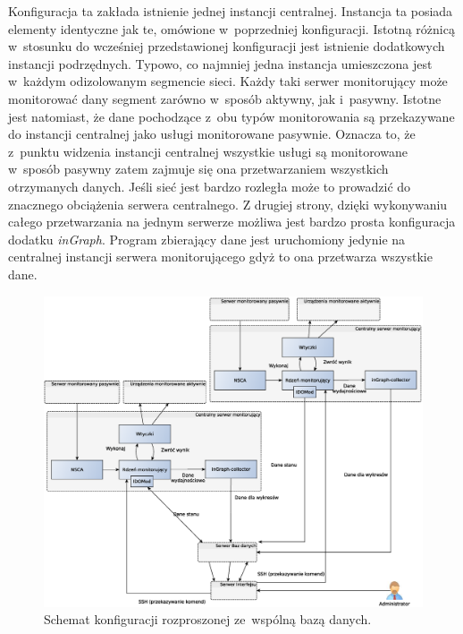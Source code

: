 Konfiguracja ta zakłada istnienie jednej instancji
centralnej. Instancja ta posiada elementy identyczne jak te, omówione
w~poprzedniej konfiguracji. Istotną różnicą w~stosunku do wcześniej
przedstawionej konfiguracji jest istnienie dodatkowych instancji
podrzędnych. Typowo, co najmniej jedna instancja umieszczona jest
w~każdym odizolowanym segmencie sieci. Każdy taki serwer monitorujący
może monitorować dany segment zarówno w~sposób aktywny, jak
i~pasywny. Istotne jest natomiast, że dane pochodzące z~obu typów
monitorowania są przekazywane do instancji centralnej jako usługi
monitorowane pasywnie. Oznacza to, że z~punktu widzenia instancji
centralnej wszystkie usługi są monitorowane w~sposób pasywny zatem
zajmuje się ona przetwarzaniem wszystkich otrzymanych danych. Jeśli
sieć jest bardzo rozległa może to prowadzić do znacznego obciążenia
serwera centralnego. Z drugiej strony, dzięki wykonywaniu całego
przetwarzania na jednym serwerze możliwa jest bardzo prosta
konfiguracja dodatku {\em inGraph}. Program zbierający dane jest
uruchomiony jedynie na centralnej instancji serwera monitorującego
gdyż to ona przetwarza wszystkie dane.

\begin{figure}[htpb]
\centering
  \caption{Schemat konfiguracji rozproszonej ze~wspólną bazą danych.}
  \label{fig:rozpFull}
\includegraphics[width=1\textwidth]{img/icingaFull}
\end{figure}

